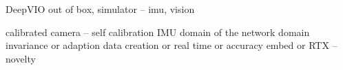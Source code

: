 \documentclass[conference]{IEEEtran}
\begin{document}
DeepVIO
out of box, 
simulator -- imu, vision

calibrated camera -- self calibration
IMU 
domain of the network
domain invariance or adaption 
data creation or 
real time or accuracy 
embed or RTX -- novelty









\end{document}
